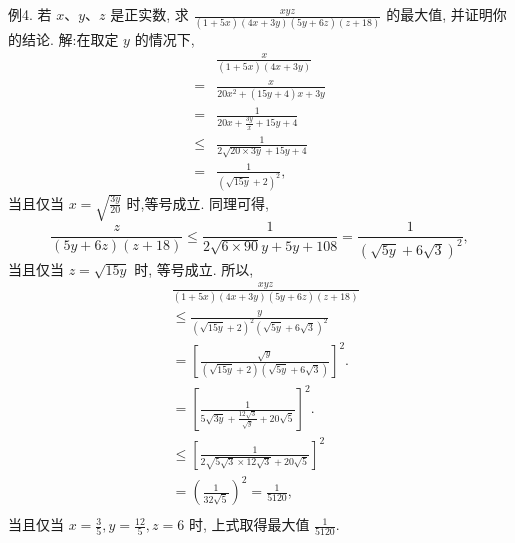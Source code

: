 例4. 若 $x 、 y 、 z$ 是正实数, 求 $\frac{x y z}{(1+5 x)(4 x+3 y)(5 y+6 z)(z+18)}$ 的最大值, 并证明你的结论.
解:在取定 $y$ 的情况下,
$$
\begin{aligned}
& \frac{x}{(1+5 x)(4 x+3 y)} \\
= & \frac{x}{20 x^2+(15 y+4) x+3 y} \\
= & \frac{1}{20 x+\frac{3 y}{x}+15 y+4} \\
\leqslant & \frac{1}{2 \sqrt{20 \times 3 y}+15 y+4} \\
= & \frac{1}{(\sqrt{15 y}+2)^2},
\end{aligned}
$$
当且仅当 $x=\sqrt{\frac{3 y}{20}}$ 时,等号成立.
同理可得,
$$
\frac{z}{(5 y+6 z)(z+18)} \leqslant \frac{1}{2 \sqrt{6 \times 90} y+5 y+108}=\frac{1}{(\sqrt{5 y}+6 \sqrt{3})^2},
$$
当且仅当 $z=\sqrt{15 y}$ 时, 等号成立.
所以,
$$
\begin{aligned}
& \frac{x y z}{(1+5 x)(4 x+3 y)(5 y+6 z)(z+18)} \\
& \leqslant \frac{y}{(\sqrt{15 y}+2)^2(\sqrt{5 y}+6 \sqrt{3})^2} \\
& =\left[\frac{\sqrt{y}}{(\sqrt{15 y}+2)(\sqrt{5 y}+6 \sqrt{3})}\right]^2 \text {. } \\
& =\left[\frac{1}{5 \sqrt{3 y}+\frac{12 \sqrt{3}}{\sqrt{y}}+20 \sqrt{5}}\right]^2 \text {. } \\
& \leqslant\left[\frac{1}{2 \sqrt{5 \sqrt{3} \times 12 \sqrt{3}}+20 \sqrt{5}}\right]^2 \\
& =\left(\frac{1}{32 \sqrt{5}}\right)^2=\frac{1}{5120} \text {, } \\
&
\end{aligned}
$$
当且仅当 $x=\frac{3}{5}, y=\frac{12}{5}, z=6$ 时, 上式取得最大值 $\frac{1}{5120}$.



